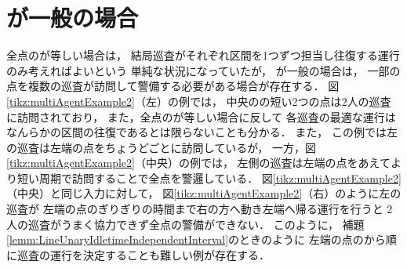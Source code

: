 \section{{\maxIdletime}が一般の場合}
\label{section:LineArbitraryIdletime}

全点の{\maxIdletime}が等しい場合は，
結局巡査がそれぞれ区間を1つずつ担当し往復する運行のみ考えればよいという
単純な状況になっていたが，
{\maxIdletime}が一般の場合は，
一部の点を複数の巡査が訪問して警備する必要がある場合が存在する．
%
図\ref{tikz:multiAgentExample2}（左）の例では，
中央の{\maxIdletime}の短い2つの点は$2$人の巡査に訪問されており，
また，全点の{\maxIdletime}が等しい場合に反して
各巡査の最適な運行はなんらかの区間の往復であるとは限らないことも分かる．
%
また，
この例では左の巡査は左端の点を{\maxIdletime}ちょうどごとに訪問しているが，
一方，図\ref{tikz:multiAgentExample2}（中央）の例では，
左側の巡査は左端の点をあえてより短い周期で訪問することで全点を警邏している．
図\ref{tikz:multiAgentExample2}（中央）と同じ入力に対して，
図\ref{tikz:multiAgentExample2}（右）のように左の巡査が
左端の点の{\maxIdletime}ぎりぎりの時間まで右の方へ動き左端へ帰る運行を行うと
$2$人の巡査がうまく協力できず全点の警備ができない．
このように，
補題\ref{lemm:LineUnaryIdletimeIndependentInterval}のときのように
左端の点の{\maxIdletime}から順に巡査の運行を決定することも難しい例が存在する．

